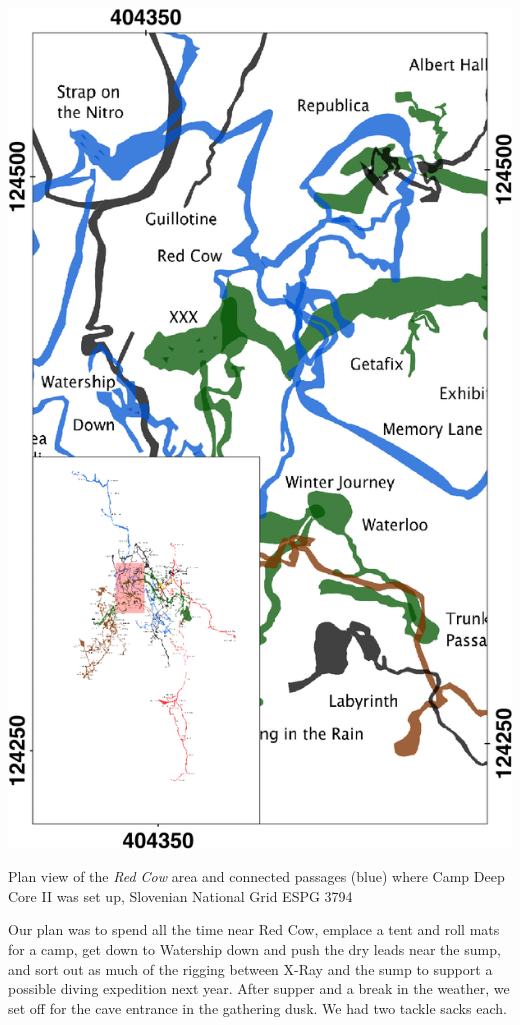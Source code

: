 \begin{marginfigure}
\checkoddpage \ifoddpage \forcerectofloat \else \forceversofloat \fi
\centering
 \includegraphics[width=\linewidth]{images/2014/jarv-2014/red_cow_inset}
 \caption{Plan view of the \emph{Red Cow} area and connected passages (blue) where Camp Deep Core II was set up, Slovenian National Grid ESPG 3794}
 \label{Red Cow inset}
\end{marginfigure}


Our plan was to spend all the time near Red Cow, emplace a tent and roll mats for a camp, get down to Watership down and push the dry leads near the sump, and sort out as much of the rigging between X-Ray and the sump to support a possible diving expedition next year.
After supper and a break in the weather, we set off for the cave entrance in the gathering dusk. We had two tackle sacks each.

